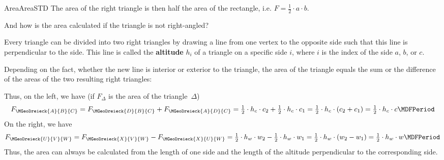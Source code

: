 \begin{MXContent}{Area}{Area}{STD}
The area of the right triangle is then half the area of the rectangle, i.e. 
$ F = \frac{1}{2}\cdot a\cdot b$.

And how is the area calculated if the triangle is not right-angled?

Every triangle can be divided into two right triangles by drawing a line 
from one vertex to the opposite side such that this line is perpendicular to the side. 
This line is called the \textbf{altitude} $h_{i}$ of a triangle on a specific side $i$,
where $i$ is the index of the side $a$, $b$, or $c$. 

Depending on the fact, whether the new line is interior or exterior to the triangle,
the area of the triangle equals the sum or the difference of the areas of the two resulting 
right triangles:

\begin{center}
\hspace{4em}
\end{center}

Thus, on the left, we have (if $F_{\Delta}$ is the area of the triangle~$\Delta$)
\[
   F_{\MGeoDreieck{A}{B}{C}}
 = F_{\MGeoDreieck{D}{B}{C}} + F_{\MGeoDreieck{A}{D}{C}}
 = \Mtfrac{1}{2} \cdot h_c \cdot c_2 + \Mtfrac{1}{2} \cdot h_c \cdot c_1
 = \Mtfrac{1}{2} \cdot h_c \cdot \left( c_2 + c_1 \right)
 = \Mtfrac{1}{2} \cdot h_c \cdot c \MDFPeriod
\]
On the right, we have
\[
   F_{\MGeoDreieck{U}{V}{W}}
 = F_{\MGeoDreieck{X}{V}{W}} - F_{\MGeoDreieck{X}{U}{W}}
 = \Mtfrac{1}{2} \cdot h_w \cdot w_2 - \Mtfrac{1}{2} \cdot h_w \cdot w_1
 = \Mtfrac{1}{2} \cdot h_w \cdot \left( w_2 - w_1 \right)
 = \Mtfrac{1}{2} \cdot h_w \cdot w \MDFPeriod
\]
Thus, the area can always be calculated from the length of one side and the 
length of the altitude perpendicular to the corresponding side.


\end{MXContent}
